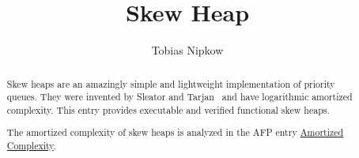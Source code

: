 \documentclass[11pt,a4paper]{article}
\begin{document}
\title{Skew Heap}
\author{Tobias Nipkow}
\maketitle

\begin{abstract}
  Skew heaps are an amazingly simple and lightweight implementation of
  priority queues. They were invented by Sleator and
  Tarjan~\cite{SleatorT-SIAM86} and have logarithmic amortized complexity.
  This entry provides executable and verified functional skew heaps.

The amortized complexity of skew heaps is analyzed in the AFP entry
\href{http://isa-afp.org/entries/Amortized_Complexity.shtml}{Amortized Complexity}.
\end{abstract}

\tableofcontents





\end{document}
